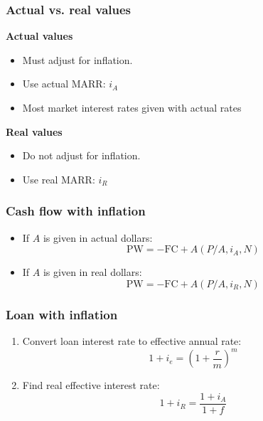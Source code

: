 \subsubsection{Actual vs. real values}
    \begin{definition}

        \textbf{Actual values}
            \begin{itemize}
                \item Must adjust for inflation. 
                \item Use actual MARR: \(i_A\)
                \item Most market interest rates given with actual rates
            \end{itemize}
        \textbf{Real values}
            \begin{itemize}
                \item Do not adjust for inflation. 
                \item Use real MARR: \(i_R\) 
            \end{itemize}
    \end{definition}
\subsubsection{Cash flow with inflation}
    \begin{definition}
        \begin{itemize}
            \item If \(A\) is given in actual dollars:
            \begin{equation}
                \text{PW} = -\text{FC} + A (P/A, i_A, N)
            \end{equation}
        
            \item If \(A\) is given in real dollars:
            \begin{equation}
                \text{PW} = -\text{FC} + A (P/A, i_R, N)
            \end{equation}
        \end{itemize}
    \end{definition}

\subsubsection{Loan with inflation}
    \begin{process}
        \begin{enumerate}
            \item Convert loan interest rate to effective annual rate:
            \begin{equation}
                1 + i_e = \left(1 + \frac{r}{m}\right)^m
            \end{equation}
        
            \item Find real effective interest rate:
            \begin{equation}
                1 + i_R = \frac{1 + i_A}{1 + f}
            \end{equation}
        \end{enumerate}
    \end{process}

